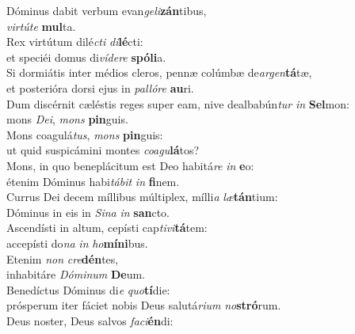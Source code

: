 \evenverse Dóminus dabit verbum evan\textit{ge}\textit{li}\textbf{zán}tibus,~\*\\
\evenverse \textit{vir}\textit{tú}\textit{te} \textbf{mul}ta.\\
\oddverse Rex virtútum dilé\textit{cti} \textit{di}\textbf{lé}cti:~\*\\
\oddverse et speciéi domus di\textit{ví}\textit{de}\textit{re} \textbf{spó}\textbf{li}a.\\
\evenverse Si dormiátis inter médios cleros, pennæ colúmbæ de\textit{ar}\textit{gen}\textbf{tá}tæ,~\*\\
\evenverse et posterióra dorsi ejus in \textit{pal}\textit{ló}\textit{re} \textbf{au}ri.\\
\oddverse Dum discérnit cæléstis reges super eam, nive dealbabún\textit{tur} \textit{in} \textbf{Sel}mon:~\*\\
\oddverse mons \textit{De}\textit{i}, \textit{mons} \textbf{pin}guis.\\
\evenverse Mons coagulá\textit{tus}, \textit{mons} \textbf{pin}guis:~\*\\
\evenverse ut quid suspicámini montes \textit{co}\textit{a}\textit{gu}\textbf{lá}tos?\\
\oddverse Mons, in quo beneplácitum est Deo habitá\textit{re} \textit{in} \textbf{e}o:~\*\\
\oddverse étenim Dóminus habi\textit{tá}\textit{bit} \textit{in} \textbf{fi}nem.\\
\evenverse Currus Dei decem míllibus múltiplex, mílli\textit{a} \textit{læ}\textbf{tán}tium:~\*\\
\evenverse Dóminus in eis in \textit{Si}\textit{na} \textit{in} \textbf{san}cto.\\
\oddverse Ascendísti in altum, cepísti cap\textit{ti}\textit{vi}\textbf{tá}tem:~\*\\
\oddverse accepísti do\textit{na} \textit{in} \textit{ho}\textbf{mí}\textbf{ni}bus.\\
\evenverse Etenim \textit{non} \textit{cre}\textbf{dén}tes,~\*\\
\evenverse inhabitáre \textit{Dó}\textit{mi}\textit{num} \textbf{De}um.\\
\oddverse Benedíctus Dóminus di\textit{e} \textit{quo}\textbf{tí}die:~\*\\
\oddverse prósperum iter fáciet nobis Deus salutá\textit{ri}\textit{um} \textit{no}\textbf{stró}rum.\\
\evenverse Deus noster, Deus salvos \textit{fa}\textit{ci}\textbf{én}di:~\*\\
